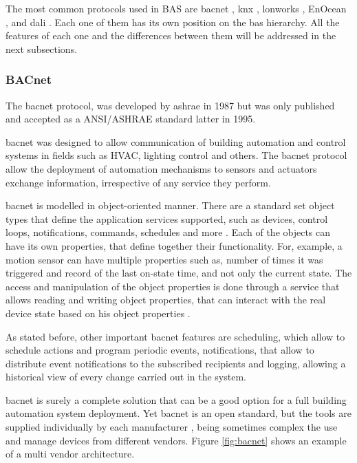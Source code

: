 The most common protocols used in BAS are \acf{bacnet} \cite{bacnet}, \acf{knx} \cite{knx}, \acf{lonworks} \cite{EchelonCorporation2009}, EnOcean \cite{enocean}, and \acf{dali} \cite{dali}. Each one of them has its own position on the \ac{bas} hierarchy. All the features of each one and the differences between them will be addressed in the next subsections.


\subsubsection{BACnet}
The \acf{bacnet} protocol, was developed by \acf{ashrae} in 1987 but was only published and accepted as a ANSI/ASHRAE standard latter in 1995.

\ac{bacnet} was designed to allow communication of building automation and control systems in fields such as HVAC, lighting control and others. The \ac{bacnet} protocol allow the deployment of automation mechanisms to sensors and actuators exchange information, irrespective of any service they perform.

\ac{bacnet} is modelled in object-oriented manner. There are a standard set object types that define the application services supported, such as devices, control loops, notifications, commands, schedules and more \cite{Domingues2016}. Each of the objects can have its own properties, that define together their functionality. For, example, a motion sensor can have multiple properties such as, number of times it was triggered and record of the last on-state time, and not only the current state. The access and manipulation of the object properties is done through a service that allows reading and writing object properties, that can interact with the real device state based on his object properties \cite{Fernbach2011}.

As stated before, other important \ac{bacnet} features are scheduling, which allow to schedule actions and program periodic events, notifications, that allow to distribute event notifications to the subscribed recipients \cite{Domingues2016} and logging, allowing a historical view of every change carried out in the system.

\ac{bacnet} is surely a complete solution that can be a good option for a full building automation system deployment. Yet \ac{bacnet} is an open standard, but the tools are supplied individually by each manufacturer \cite{openprotocol}, being sometimes complex the use and manage devices from different vendors. Figure \ref{fig:bacnet} shows an example of a multi vendor architecture.


